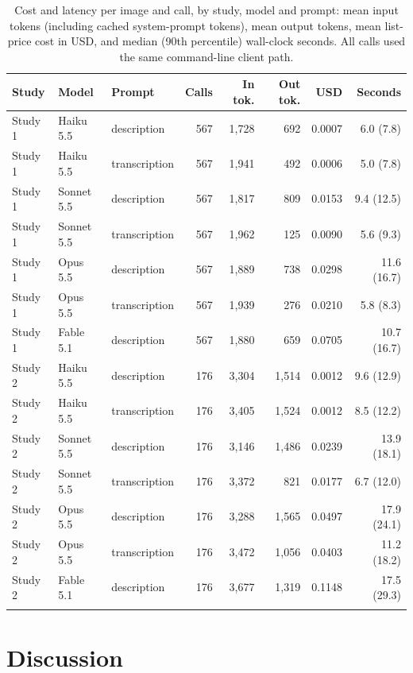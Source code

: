 \documentclass[pdflatex,sn-mathphys-num]{sn-jnl}%
\theoremstyle{thmstyleone}%
\theoremstyle{thmstyletwo}%
\theoremstyle{thmstylethree}%
\begin{document}
\begin{table}[!htbp]
\caption{Cost and latency per image and call, by study, model and prompt: mean input tokens (including cached system-prompt tokens), mean output tokens, mean list-price cost in USD, and median (90th percentile) wall-clock seconds. All calls used the same command-line client path.}\label{tab:cost}
\footnotesize
\setlength{\tabcolsep}{3pt}
\begin{tabular*}{\textwidth}{@{\extracolsep\fill}lllrrrrr}
\toprule
Study & Model & Prompt & Calls & In tok. & Out tok. & USD & Seconds \\
\midrule
Study 1 & Haiku 5.5 & description & 567 & 1{,}728 & 692 & 0.0007 & 6.0 (7.8) \\
Study 1 & Haiku 5.5 & transcription & 567 & 1{,}941 & 492 & 0.0006 & 5.0 (7.8) \\
Study 1 & Sonnet 5.5 & description & 567 & 1{,}817 & 809 & 0.0153 & 9.4 (12.5) \\
Study 1 & Sonnet 5.5 & transcription & 567 & 1{,}962 & 125 & 0.0090 & 5.6 (9.3) \\
Study 1 & Opus 5.5 & description & 567 & 1{,}889 & 738 & 0.0298 & 11.6 (16.7) \\
Study 1 & Opus 5.5 & transcription & 567 & 1{,}939 & 276 & 0.0210 & 5.8 (8.3) \\
Study 1 & Fable 5.1 & description & 567 & 1{,}880 & 659 & 0.0705 & 10.7 (16.7) \\
Study 2 & Haiku 5.5 & description & 176 & 3{,}304 & 1{,}514 & 0.0012 & 9.6 (12.9) \\
Study 2 & Haiku 5.5 & transcription & 176 & 3{,}405 & 1{,}524 & 0.0012 & 8.5 (12.2) \\
Study 2 & Sonnet 5.5 & description & 176 & 3{,}146 & 1{,}486 & 0.0239 & 13.9 (18.1) \\
Study 2 & Sonnet 5.5 & transcription & 176 & 3{,}372 & 821 & 0.0177 & 6.7 (12.0) \\
Study 2 & Opus 5.5 & description & 176 & 3{,}288 & 1{,}565 & 0.0497 & 17.9 (24.1) \\
Study 2 & Opus 5.5 & transcription & 176 & 3{,}472 & 1{,}056 & 0.0403 & 11.2 (18.2) \\
Study 2 & Fable 5.1 & description & 176 & 3{,}677 & 1{,}319 & 0.1148 & 17.5 (29.3) \\
\botrule
\end{tabular*}
\end{table}



\section{Discussion}\label{sec:discussion}
\end{document}
